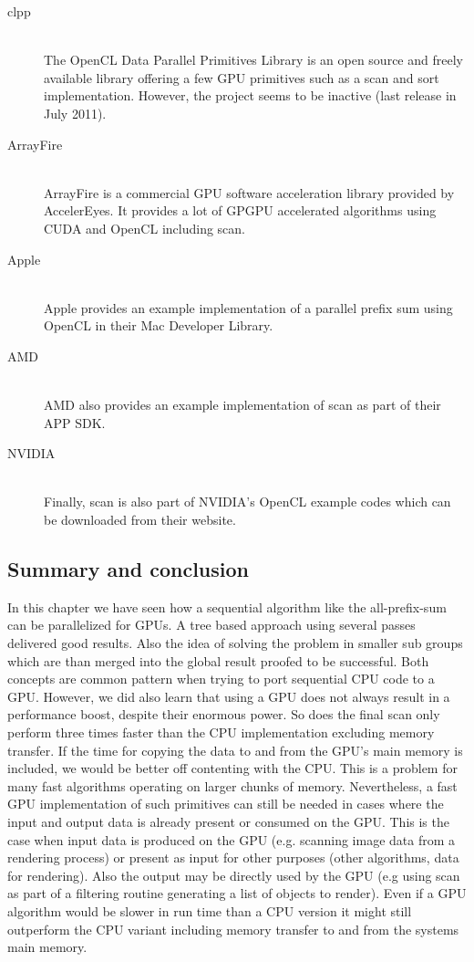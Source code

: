 \begin{description}
   \item[clpp \cite{clpp}] \hfill \\
   The OpenCL Data Parallel Primitives Library is an open source and freely available library offering a few GPU primitives such as a scan and sort implementation. However, the project seems to be inactive (last release in July 2011).
   \item[ArrayFire \cite{arrayfire}] \hfill \\
   ArrayFire is a commercial GPU software acceleration library provided by AccelerEyes. It provides a lot of GPGPU accelerated algorithms using CUDA and OpenCL including scan.
   \item[Apple \cite{apple_scan}] \hfill \\
   Apple provides an example implementation of a parallel prefix sum using OpenCL in their Mac Developer Library.
   \item[AMD \cite{amd_app_sdk}] \hfill \\
   AMD also provides an example implementation of scan as part of their APP SDK.
   \item[NVIDIA \cite{nvidia_opencl_samples}] \hfill \\
   Finally, scan is also part of NVIDIA's OpenCL example codes which can be downloaded from their website.
\end{description}

\subsection{Summary and conclusion}
In this chapter we have seen how a sequential algorithm like the all-prefix-sum can be parallelized for GPUs. A tree based approach using several passes delivered good results. Also the idea of solving the problem in smaller sub groups which are than merged into the global result proofed to be successful. Both concepts are common pattern when trying to port sequential CPU code to a GPU. However, we did also learn that using a GPU does not always result in a performance boost, despite their enormous power. So does the final scan only perform three times faster than the CPU implementation excluding memory transfer. If the time for copying the data to and from the GPU's main memory is included, we would be better off contenting with the CPU. This is a problem for many fast algorithms operating on larger chunks of memory. Nevertheless, a fast GPU implementation of such primitives can still be needed in cases where the input and output data is already present or consumed on the GPU. This is the case when input data is produced on the GPU (e.g. scanning image data from a rendering process) or present as input for other purposes (other algorithms, data for rendering). Also the output may be directly used by the GPU (e.g using scan as part of a filtering routine generating a list of objects to render). Even if a GPU algorithm would be slower in run time than a CPU version it might still outperform the CPU variant including memory transfer to and from the systems main memory.
